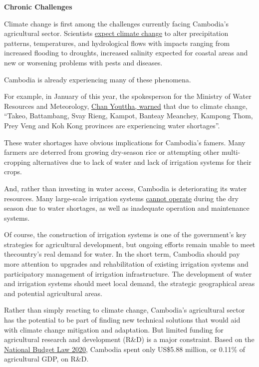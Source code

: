 \documentclass[10pt,a4paper]{letter}
\begin{document}
\textbf{Chronic Challenges}

Climate change is first among the challenges currently facing Cambodia's agricultural sector. Scientists \href{https://snv.org/cms/sites/default/files/explore/download/csa_technology_case_study_eng_final.pdf}{expect climate change}
to alter precipitation patterns, temperatures, and hydrological flows with impacts ranging from increased flooding to droughts, increased salinity expected for coastal areas and new or worsening problems with pests and diseases.

Cambodia is already experiencing many of these phenomena.

For example, in January of this year, the spokesperson for the Ministry of Water Resources and Meteorology, \href{https://www.khmertimeskh.com/679098/provinces-face-water-shortage-due-to-rice-cultivatio/}{Chan Youttha, warned} that due to climate change, ``Takeo, Battambang, Svay Rieng, Kampot, Banteay Meanchey, Kampong Thom, Prey Veng and Koh Kong provinces are experiencing water shortages''.

These water shortages have obvious implications for Cambodia's famers. Many farmers are deterred from growing dry-season rice or attempting other multi-cropping alternatives due to lack of water and lack of irrigation systems for their crops.

And, rather than investing in water access, Cambodia is deteriorating its water resources. Many large-scale irrigation systems \href{https://www.mdpi.com/2079-9276/6/3/44}{cannot operate} during the dry season due to water shortages, as well as inadequate operation and maintenance systems.

Of course, the construction of irrigation systems is one of the government's key strategies for agricultural development, but ongoing efforts remain unable to meet thecountry's real demand for water. In the short term, Cambodia should pay more attention to upgrades and rehabilitation of existing irrigation systems and participatory management of irrigation infrastructure. The development of water and irrigation systems should meet local demand, the strategic geographical areas and potential agricultural areas.

Rather than simply reacting to climate change, Cambodia's agricultural sector has the potential to be part of finding new technical solutions that would aid with climate change mitigation and adaptation. But limited funding for agricultural research and development (R\&D) is a major constraint. Based on the \href{https://www.mef.gov.kh/documents/laws_regulation/3-Budget-Law-2020.pdf}{National Budget Law 2020}, Cambodia spent only US\$5.88 million, or 0.11\% of agricultural GDP, on R\&D.
\end{document}
